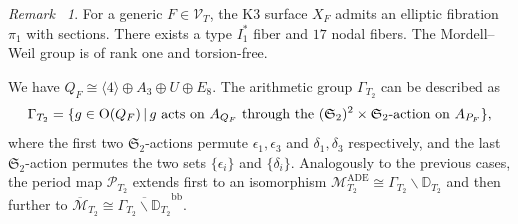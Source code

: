 \documentclass[12pt,reqno,a4paper]{amsart}
\theoremstyle{remark}
\newtheorem{rmk}[thm]{Remark~}
\theoremstyle{definition}
\newcommand{\PP}{\mathbb{P}}
\newcommand{\DD}{\mathbb{D}}
\newcommand{\Prd}{\mathscr{P}}
\newcommand{\calM}{\mathcal{M}}
\newcommand{\calV}{\mathcal{V}}
\newcommand\Or{\mathrm{O}}
\newcommand{\bs}{\backslash}
\begin{document}
\begin{rmk}
    For a generic $F\in\calV_T$, the K3 surface $X_F$ admits an elliptic fibration $\pi_1$ with sections.
    There exists a type $I_1^*$ fiber and $17$ nodal fibers.
    The Mordell--Weil group is of rank one and torsion-free.
\end{rmk}

We have $Q_F\cong \langle 4\rangle\oplus A_3\oplus U\oplus E_8$.
The arithmetic group $\Gamma_{T_2}$ can be described as
\begin{equation*}
    \Gamma_{T_2} = \{ g\in\Or(Q_F) \,|\, g \textup{ acts on } A_{Q_F} \textup{ through the } (\mathfrak{S}_2)^2\times\mathfrak{S}_2\textup{-action on } A_{P_F} \},
\end{equation*}
where the first two $\mathfrak{S}_2$-actions permute $\epsilon_1,\epsilon_3$ and $\delta_1,\delta_3$ respectively, and the last $\mathfrak{S}_2$-action permutes the two sets $\{\epsilon_i\}$ and $\{\delta_i\}$. 
Analogously to the previous cases, the period map $\Prd_{T_2}$ extends first to an isomorphism $\calM_{T_2}^{\mathrm{ADE}} \cong \Gamma_{T_2} \bs \DD_{T_2}$ and then further to $\overline{\calM}_{T_2} \cong \overline{\Gamma_{T_2} \bs \DD_{T_2}}^{\mathrm{bb}}$. 


\end{document}
